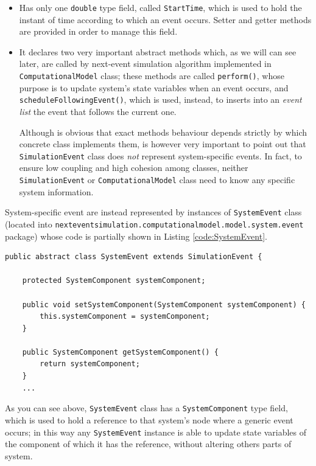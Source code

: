 \documentclass[10pt,a4paper]{article}
\begin{document}
\begin{itemize}
\item Has only one \texttt{double} type field, called \texttt{StartTime}, which is used to hold the instant of time according to which an event occurs. Setter and getter methods are provided in order to manage this field.

\item It declares two very important abstract methods which, as we will can see later, are called by next-event simulation algorithm implemented in \texttt{ComputationalModel} class; these methods are called \texttt{perform()}, whose purpose is to update system's state variables when an event occurs, and \texttt{schedule\-Following\-Event()}, which is used, instead, to inserts into an \textit{event list} the event that follows the current one.

Although is obvious that exact methods behaviour depends strictly by which concrete class implements them, is however very important to point out that \texttt{SimulationEvent} class does \textit{not} represent system-specific events. In fact, to ensure low coupling and high cohesion among classes, neither \texttt{SimulationEvent} or \texttt{ComputationalModel} class need to know any specific system information. 
\end{itemize}

System-specific event are instead represented by instances of \texttt{SystemEvent} class (located into \texttt{nexteventsimulation.computationalmodel.model.\-sy\-stem.\-ev\-ent} package) whose code is partially shown in Listing \ref{code:SystemEvent}. 


\begin{lstlisting}[frame=lines, caption={\texttt{SystemEvent} class implementation.}, label={code:SystemEvent}]
public abstract class SystemEvent extends SimulationEvent {

    protected SystemComponent systemComponent;

    public void setSystemComponent(SystemComponent systemComponent) {
        this.systemComponent = systemComponent;
    }

    public SystemComponent getSystemComponent() {
        return systemComponent;
    }
    ...
\end{lstlisting}

As you can see above, \texttt{SystemEvent} class has a \texttt{SystemComponent} type field, which is used to hold a reference to that system's node where a generic event occurs; in this way any \texttt{SystemEvent} instance is able to update state variables of the component of which it has the reference, without altering others parts of system.
\end{document}
